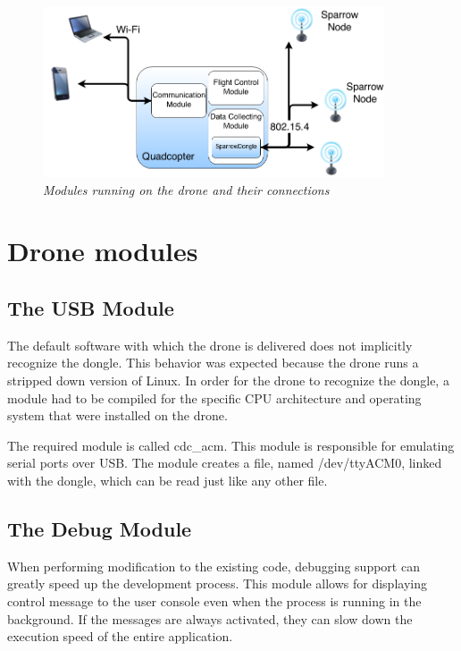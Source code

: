 \begin{figure}[ht]
\begin{center}
\includegraphics[width=0.9\textwidth]{img/organigrama.png}
\end{center}
\caption{\small \itshape{Modules running on the drone and their connections}}
  \label{fig:arhitecture}
\end{figure}

\section{Drone modules}

\subsection{The USB Module}

The default software with which the drone is delivered does not implicitly recognize the dongle. This behavior was expected because the drone runs a stripped down version of Linux. In order for the drone to recognize the dongle, a module had to be compiled for the specific CPU architecture and operating system that were installed on the drone.

The required module is called cdc\_acm\cite{cdcacm}. This module is responsible for emulating serial ports over USB. The module creates a file, named /dev/ttyACM0, linked with the dongle, which can be read just like any other file.

\subsection{The Debug Module}

When performing modification to the existing code, debugging support can greatly speed up the development process. This module allows for displaying control message to the user console even when the process is running in the background. If the messages are always activated, they can slow down the execution speed of the entire application.

